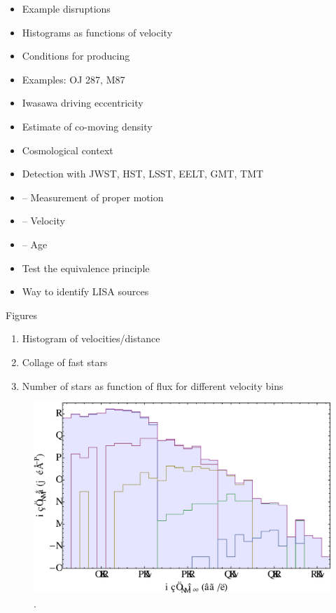 \documentclass[a4paper,twocolumn]{emulateapj}
\begin{document}
\begin{itemize}
\item Example disruptions
\item Histograms as functions of velocity
\item Conditions for producing
\item Examples: OJ 287, M87
\item Iwasawa driving eccentricity
\item Estimate of co-moving density
\item Cosmological context
\item Detection with JWST, HST, LSST, EELT, GMT, TMT
\item -- Measurement of proper motion
\item -- Velocity
\item -- Age
\item Test the equivalence principle
\item Way to identify LISA sources
\end{itemize}

Figures

\begin{enumerate}
\item Histogram of velocities/distance
\item Collage of fast stars
\item Number of stars as function of flux for different velocity bins
\end{enumerate}

\begin{figure}
\centering\includegraphics[width=\linewidth,clip=true]{histogram}
\caption{.}
\label{fig:histogram}
\end{figure}
\end{document}
